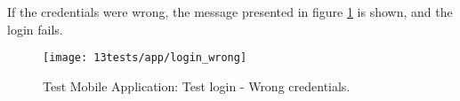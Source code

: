 If the credentials were wrong, the message presented in figure \ref{fig:login_wrong} is shown, and the login fails.

\begin{figure}[H]
	\centering	
	\texttt{[image: 13tests/app/login\_wrong]}
	\caption{Test Mobile Application: Test login - Wrong credentials.}
	\label{fig:login_wrong}
\end{figure}
